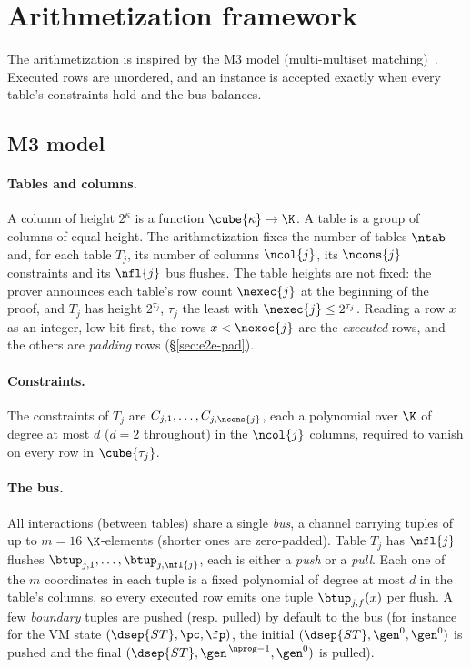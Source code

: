 \section{Arithmetization framework}\label{sec:arith}

The arithmetization is inspired by the M3 model (multi-multiset matching)~\cite{m3}. Executed rows are unordered, and an instance is accepted exactly when every table's constraints hold and the bus balances.

\subsection{M3 model}\label{sec:m3}

\paragraph{Tables and columns.} A column of height $2^{\kappa}$ is a function $\cube{\kappa}\to\K$. A table is a group of columns of equal height. The arithmetization fixes the number of tables $\ntab$ and, for each table $T_j$, its number of columns $\ncol{j}$, its $\ncons{j}$ constraints and its $\nfl{j}$ bus flushes. The table heights are not fixed: the prover announces each table's row count $\nexec{j}$ at the beginning of the proof, and $T_j$ has height $2^{\tau_j}$, $\tau_j$ the least with $\nexec{j}\le2^{\tau_j}$. Reading a row $x$ as an integer, low bit first, the rows $x<\nexec{j}$ are the \emph{executed} rows, and the others are \emph{padding} rows (\S\ref{sec:e2e-pad}).

\paragraph{Constraints.} The constraints of $T_j$ are $C_{j,1},\dots,C_{j,\ncons{j}}$, each a polynomial over $\K$ of degree at most $d$ ($d=2$ throughout) in the $\ncol{j}$ columns, required to vanish on every row in $\cube{\tau_j}$.

\paragraph{The bus.} All interactions (between tables) share a single \emph{bus}, a channel carrying tuples of up to $m=16$ $\K$-elements (shorter ones are zero-padded). Table $T_j$ has $\nfl{j}$ flushes $\btup_{j,1},\dots,\btup_{j,\nfl{j}}$, each is either a \emph{push} or a \emph{pull}. Each one of the $m$ coordinates in each tuple is a fixed polynomial of degree at most $d$ in the table's columns, so every executed row emits one tuple $\btup_{j,f}(x)$ per flush. A few \emph{boundary} tuples are pushed (resp. pulled) by default to the bus (for instance for the VM state $(\dsep{ST}, \pc, \fp)$, the initial $(\dsep{ST}, \gen^0, \gen^0)$ is pushed and the final $(\dsep{ST}, \gen^{\,\nprog-1}, \gen^{0})$ is pulled).

